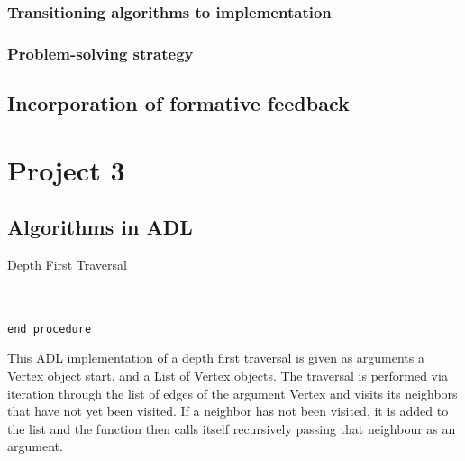 \documentclass[a4paper]{article}
\begin{document}
\subsubsection{Transitioning algorithms to implementation}
\subsubsection{Problem-solving strategy}

\subsection{Incorporation of formative feedback}





\newpage


\section{Project 3}
\subsection{Algorithms in ADL}

\makeatletter
\renewcommand{\ALG@name}{Algorithm}
\makeatother
\setcounter{algorithm}{0}

\begin{algorithm}
\caption{Depth First Traversal}\label{euclid}
\begin{algorithmic}[1]

 \\
\State{}
\State{}
\State\quad{}
\State\quad{}
\State{}
 \\
{\tt end procedure}

\EndProcedure
\end{algorithmic}
\end{algorithm}

This ADL implementation of a depth first traversal 
is given as arguments
a Vertex object start,
and a List of Vertex objects.
The traversal is performed via
iteration through the list of edges of the argument Vertex
and visits its neighbors that have not yet been visited.
If a neighbor has not been visited, it is added to the list and the function then calls itself 
recursively passing that neighbour as an argument.
\end{document}
